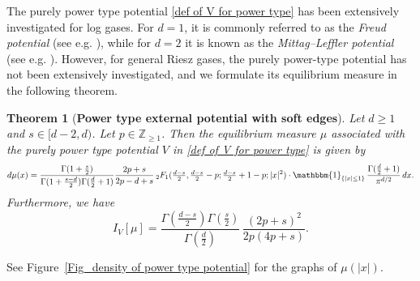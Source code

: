\documentclass[10pt]{amsart}
\theoremstyle{plain}
\newtheorem{thm}{Theorem}[section]
\theoremstyle{remark}
\numberwithin{equation}{section}
\begin{document}
The purely power type potential \eqref{def of V for power type} has been extensively investigated for log gases. For $d=1$, it is commonly referred to as the \emph{Freud potential} (see e.g. \cite{CKM23}), while for $d=2$ it is known as the \emph{Mittag--Leffler potential} (see e.g. \cite{Ch22,Ch23,ACCL24,Be25}).
However, for general Riesz gases, the purely power-type potential has not been extensively investigated, and we formulate its equilibrium measure in the following theorem.
 

\begin{thm}[\textbf{Power type external potential with soft edges}] \label{Thm_eq msr for power potential} Let $d \ge 1$ and $s \in [d-2,d)$. Let  $p\in \mathbb{Z}_{ \ge 1 }$. Then the equilibrium measure $\mu$ associated with the purely power type potential $V$ in \eqref{def of V for power type} is given by 
\begin{equation} \label{def of power type potential eq msr}
d\mu(x) =  \frac{\Gamma(1+\tfrac{s}{2})  } { \Gamma(1+\frac{s-d}{2}) \Gamma(\frac{d}{2}+1) }   \frac{ 2p+s }{ 2p-d+s } \, {}_2F_1( \tfrac{d-s}{2}, \tfrac{d-s}{2}-p; \tfrac{d-s}{2}+1-p; |x|^2 ) \cdot  \mathbbm{1}_{ \{ |x| \le 1 \} } \,  \frac{ \Gamma(\frac{d}{2}+1) }{\pi^{ d/2 }}\,dx   .
\end{equation} 
Furthermore, we have 
\begin{equation} \label{energy for power type potential}
I_V[\mu]=  \frac{ \Gamma( \tfrac{d-s}{2} ) \Gamma(\frac{s}{2})}{ \Gamma( \frac{d}{2} ) } \, \frac{(2p+s)^2}{ 2 p(4p+s)  }  . 
\end{equation}
\end{thm}

See Figure~\ref{Fig_density of power type potential} for the graphs of $\mu(|x|)$. 
\end{document}
